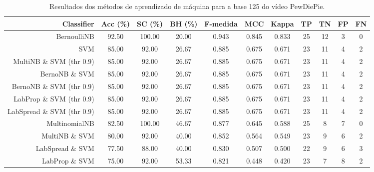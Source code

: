 \begin{table}[!htb]
\centering
\caption{Resultados dos métodos de aprendizado de máquina para a base 125 do vídeo PewDiePie.}
\label{tab:PewDiePie-125}
\begin{tabular}{r|c|c|c|c|c|c|c|c|c|c}
\hline\hline
Classifier & Acc (\%) & SC (\%) & BH (\%) & F-medida & MCC & Kappa & TP & TN & FP & FN \\ \hline
BernoulliNB & 92.50 & 100.00 & 20.00 & 0.943 & 0.845 & 0.833 & 25 & 12 & 3 & 0 \\ 
SVM & 85.00 & 92.00 & 26.67 & 0.885 & 0.675 & 0.671 & 23 & 11 & 4 & 2 \\ 
MultiNB \& SVM (thr 0.9) & 85.00 & 92.00 & 26.67 & 0.885 & 0.675 & 0.671 & 23 & 11 & 4 & 2 \\ 
BernoNB \& SVM & 85.00 & 92.00 & 26.67 & 0.885 & 0.675 & 0.671 & 23 & 11 & 4 & 2 \\ 
BernoNB \& SVM (thr 0.9) & 85.00 & 92.00 & 26.67 & 0.885 & 0.675 & 0.671 & 23 & 11 & 4 & 2 \\ 
LabProp \& SVM (thr 0.9) & 85.00 & 92.00 & 26.67 & 0.885 & 0.675 & 0.671 & 23 & 11 & 4 & 2 \\ 
LabSpread \& SVM (thr 0.9) & 85.00 & 92.00 & 26.67 & 0.885 & 0.675 & 0.671 & 23 & 11 & 4 & 2 \\ 
MultinomialNB & 82.50 & 100.00 & 46.67 & 0.877 & 0.645 & 0.588 & 25 & 8 & 7 & 0 \\ 
MultiNB \& SVM & 80.00 & 92.00 & 40.00 & 0.852 & 0.564 & 0.549 & 23 & 9 & 6 & 2 \\ 
LabSpread \& SVM & 77.50 & 88.00 & 40.00 & 0.830 & 0.507 & 0.500 & 22 & 9 & 6 & 3 \\ 
LabProp \& SVM & 75.00 & 92.00 & 53.33 & 0.821 & 0.448 & 0.420 & 23 & 7 & 8 & 2 \\ 
\hline\hline
\end{tabular}
\end{table}
